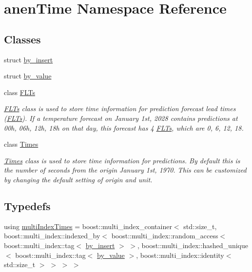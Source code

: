 \hypertarget{namespaceanen_time}{}\section{anen\+Time Namespace Reference}
\label{namespaceanen_time}
\subsection*{Classes}
\begin{DoxyCompactItemize}
\item 
struct \mbox{\hyperlink{structanen_time_1_1by__insert}{by\+\_\+insert}}
\item 
struct \mbox{\hyperlink{structanen_time_1_1by__value}{by\+\_\+value}}
\item 
class \mbox{\hyperlink{classanen_time_1_1_f_l_ts}{F\+L\+Ts}}
\begin{DoxyCompactList}\small\item\em \mbox{\hyperlink{classanen_time_1_1_f_l_ts}{F\+L\+Ts}} class is used to store time information for prediction forecast lead times (\mbox{\hyperlink{classanen_time_1_1_f_l_ts}{F\+L\+Ts}}). If a temperature forecast on January 1st, 2028 contains predictions at 00h, 06h, 12h, 18h on that day, this forecast has 4 \mbox{\hyperlink{classanen_time_1_1_f_l_ts}{F\+L\+Ts}}, which are 0, 6, 12, 18. \end{DoxyCompactList}\item 
class \mbox{\hyperlink{classanen_time_1_1_times}{Times}}
\begin{DoxyCompactList}\small\item\em \mbox{\hyperlink{classanen_time_1_1_times}{Times}} class is used to store time information for predictions. By default this is the number of seconds from the origin January 1st, 1970. This can be customized by changing the default setting of origin and unit. \end{DoxyCompactList}\end{DoxyCompactItemize}
\subsection*{Typedefs}
\begin{DoxyCompactItemize}
\item 
using \mbox{\hyperlink{namespaceanen_time_a235ffbd1f772e49b036a80c4bd766f90}{multi\+Index\+Times}} = boost\+::multi\+\_\+index\+\_\+container$<$ std\+::size\+\_\+t, boost\+::multi\+\_\+index\+::indexed\+\_\+by$<$ boost\+::multi\+\_\+index\+::random\+\_\+access$<$ boost\+::multi\+\_\+index\+::tag$<$ \mbox{\hyperlink{structanen_time_1_1by__insert}{by\+\_\+insert}} $>$ $>$, boost\+::multi\+\_\+index\+::hashed\+\_\+unique$<$ boost\+::multi\+\_\+index\+::tag$<$ \mbox{\hyperlink{structanen_time_1_1by__value}{by\+\_\+value}} $>$, boost\+::multi\+\_\+index\+::identity$<$ std\+::size\+\_\+t $>$ $>$ $>$ $>$
\end{DoxyCompactItemize}
